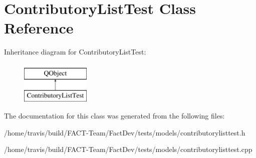 \hypertarget{classContributoryListTest}{\section{Contributory\-List\-Test Class Reference}
\label{classContributoryListTest}
}
Inheritance diagram for Contributory\-List\-Test\-:\begin{figure}[H]
\begin{center}
\leavevmode
\includegraphics[height=2.000000cm]{d4/de2/classContributoryListTest}
\end{center}
\end{figure}


The documentation for this class was generated from the following files\-:\begin{DoxyCompactItemize}
\item 
/home/travis/build/\-F\-A\-C\-T-\/\-Team/\-Fact\-Dev/tests/models/contributorylisttest.\-h\item 
/home/travis/build/\-F\-A\-C\-T-\/\-Team/\-Fact\-Dev/tests/models/contributorylisttest.\-cpp\end{DoxyCompactItemize}
